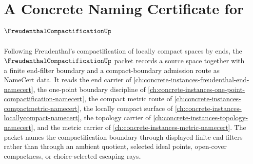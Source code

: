 \chapter{A Concrete Naming Certificate for $\FreudenthalCompactificationUp$}
\label{ch:concrete-instances-freudenthal-compactification-namecert}

Following Freudenthal's compactification of locally compact spaces by ends, the $\FreudenthalCompactificationUp$ packet records a source space together with a finite end-filter boundary and a compact-boundary admission route as NameCert data. It reads the end carrier of \autoref{ch:concrete-instances-freudenthal-end-namecert}, the one-point boundary discipline of \autoref{ch:concrete-instances-one-point-compactification-namecert}, the compact metric route of \autoref{ch:concrete-instances-compactmetric-namecert}, the locally compact surface of \autoref{ch:concrete-instances-locallycompact-namecert}, the topology carrier of \autoref{ch:concrete-instances-topology-namecert}, and the metric carrier of \autoref{ch:concrete-instances-metric-namecert}. The packet names the compactification boundary through displayed finite end filters rather than through an ambient quotient, selected ideal points, open-cover compactness, or choice-selected escaping rays.

